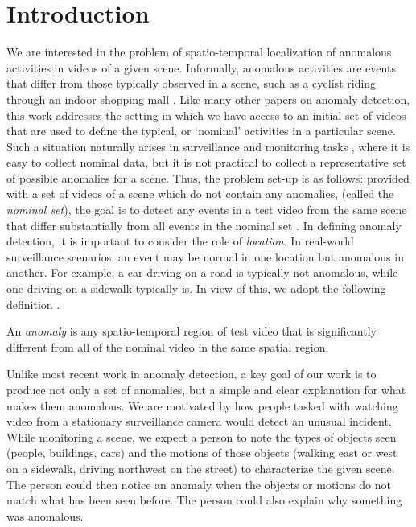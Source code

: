 \section{Introduction}
\label{sec:intro}
We are interested in the problem of spatio-temporal localization of anomalous activities in videos of a given scene. Informally, anomalous activities are  events that differ from those typically observed in a scene, such as a cyclist riding through an indoor shopping mall \cite{ramachandra2020survey}.  Like many other papers on anomaly detection, this work addresses the setting in which we have access to an initial set of videos that are used to define the typical, or `nominal' activities in a particular scene. Such a situation naturally arises in  surveillance and monitoring tasks \cite{saligrama2010video}, where it is easy to collect nominal data, but it is not practical to collect a representative set of possible anomalies for a scene.
Thus, the problem set-up is as follows: provided with a set of videos of a scene which do not contain any anomalies, (called the {\em nominal set}), the goal is to detect any events in a test video from the same scene that differ substantially from all events in the nominal set \cite{mahadevan2010anomaly, ramachandra2020survey}.  In defining anomaly detection, it is important to consider the role of {\em location}.
In real-world surveillance scenarios, an event may be normal in one location but anomalous in another. For example, a car driving on a road is typically not anomalous, while one driving on a sidewalk typically is. In view of this, we adopt the following definition \cite{ramachandra2020survey}.

\begin{definition}
\vspace{-8pt}
 An {\it anomaly} is any spatio-temporal region of test video that is significantly different from all of the nominal video in the same spatial region. 
 \vspace{-10pt}
\end{definition}

Unlike most recent work in anomaly detection, a key goal of our work is to produce not only a set of anomalies, but a simple and clear explanation for what makes them anomalous. 
We are motivated by how people tasked with watching video from a stationary surveillance camera would detect an unusual incident.
While monitoring a scene, we expect a person to note the types of objects seen (people, buildings, cars) and the motions of those objects (walking east or west on a sidewalk, driving northwest on the street) to characterize the given scene.  The person could then notice an anomaly when the objects or motions do not match what has been seen before.  The person could also explain why something was anomalous.

